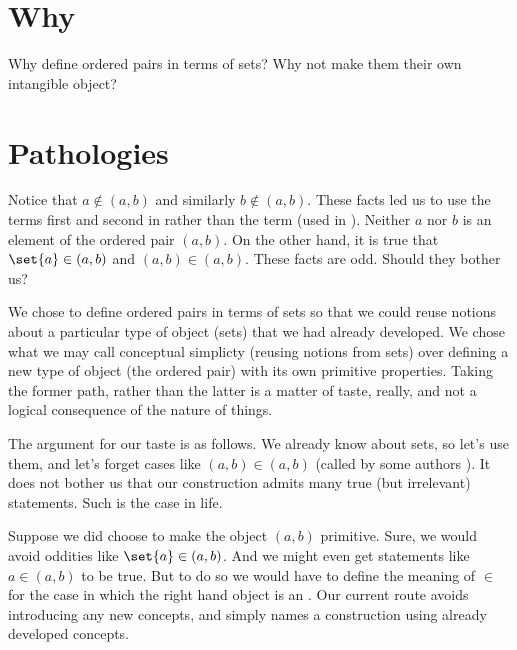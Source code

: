 

\section*{Why}

Why define ordered pairs in terms of sets?
Why not make them their own intangible object?

\section*{Pathologies}

Notice that $a \not\in (a, b)$ and similarly $b \not\in (a, b)$.
These facts led us to use the terms first and second  in rather than the term  (used in ).
Neither $a$ nor $b$ is an element of the ordered pair $(a, b)$.
On the other hand, it is true that $\set{a} \in (a, b)$ and $(a, b) \in (a, b)$.
These facts are odd.
Should they bother us?

We chose to define ordered pairs in terms of sets so that we could reuse notions about a particular type of object (sets) that we had already developed.
We chose what we may call conceptual simplicty (reusing notions from sets) over defining a new type of object (the ordered pair) with its own primitive properties.
Taking the former path, rather than the latter is a matter of taste, really, and not a logical consequence of the nature of things.

The argument for our taste is as follows.
We already know about sets, so let's use them, and let's forget cases like $(a, b) \in (a, b)$ (called by some authors ).
It does not bother us that our construction admits many true (but irrelevant) statements.
Such is the case in life.

Suppose we did choose to make the object $(a, b)$ primitive.
Sure, we would avoid oddities like $\set{a} \in (a, b)$.
And we might even get statements like $a \in (a, b)$ to be true.
But to do so we would have to define the meaning of $\in$ for the case in which the right hand object is an .
Our current route avoids introducing any new concepts, and simply names a construction using already developed concepts.

\blankpage